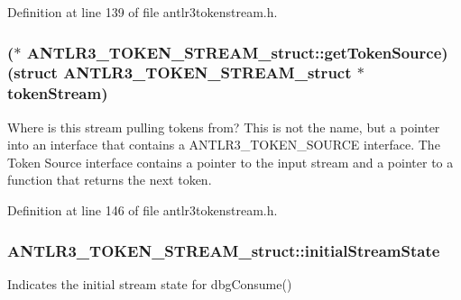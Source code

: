 Definition at line 139 of file antlr3tokenstream.\-h.

\hypertarget{struct_a_n_t_l_r3___t_o_k_e_n___s_t_r_e_a_m__struct_acda0d0fe7a53f7f4276617f578ac74c2}{
\subsubsection[{get\-Token\-Source}]{($\ast$ A\-N\-T\-L\-R3\-\_\-\-T\-O\-K\-E\-N\-\_\-\-S\-T\-R\-E\-A\-M\-\_\-struct\-::get\-Token\-Source)(struct {\bf A\-N\-T\-L\-R3\-\_\-\-T\-O\-K\-E\-N\-\_\-\-S\-T\-R\-E\-A\-M\-\_\-struct} $\ast$token\-Stream)}}\label{struct_a_n_t_l_r3___t_o_k_e_n___s_t_r_e_a_m__struct_acda0d0fe7a53f7f4276617f578ac74c2}
Where is this stream pulling tokens from? This is not the name, but a pointer into an interface that contains a A\-N\-T\-L\-R3\-\_\-\-T\-O\-K\-E\-N\-\_\-\-S\-O\-U\-R\-C\-E interface. The Token Source interface contains a pointer to the input stream and a pointer to a function that returns the next token. 

Definition at line 146 of file antlr3tokenstream.\-h.

\hypertarget{struct_a_n_t_l_r3___t_o_k_e_n___s_t_r_e_a_m__struct_a35ccd790082224719a528653cd9d57fa}{
\subsubsection[{initial\-Stream\-State}]{ A\-N\-T\-L\-R3\-\_\-\-T\-O\-K\-E\-N\-\_\-\-S\-T\-R\-E\-A\-M\-\_\-struct\-::initial\-Stream\-State}}\label{struct_a_n_t_l_r3___t_o_k_e_n___s_t_r_e_a_m__struct_a35ccd790082224719a528653cd9d57fa}
Indicates the initial stream state for dbg\-Consume() 

